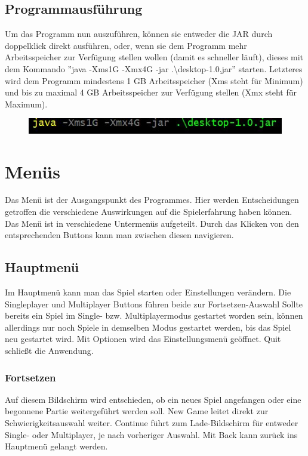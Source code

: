 \documentclass[fontsize=12pt,paper=a4,twoside]{scrartcl}
\begin{document}

\subsection{Programmausführung}

Um das Programm nun auszuführen, können sie entweder die JAR durch doppelklick direkt ausführen, oder, wenn sie dem Programm mehr Arbeitsspeicher zur Verfügung stellen wollen (damit es schneller läuft), dieses mit dem Kommando ''java -Xms1G -Xmx4G -jar .\textbackslash desktop-1.0,jar'' starten. Letzteres wird dem Programm mindestens 1 GB Arbeitsspeicher  (Xms steht für Minimum) und bis zu maximal 4 GB Arbeitsspeicher zur Verfügung stellen (Xmx steht für Maximum).

\begin{figure}[h!]
\centering
\includegraphics[width=0.8\linewidth]{run_application.JPG}
\end{figure} 


\section{Menüs}
Das Menü ist der Ausgangspunkt des Programmes. Hier werden Entscheidungen getroffen die verschiedene Auswirkungen auf die Spielerfahrung haben können.
Das Menü ist in verschiedene Untermenüs aufgeteilt. Durch das Klicken von den entsprechenden Buttons kann man zwischen diesen navigieren.

\subsection{Hauptmenü}
Im Hauptmenü kann man das Spiel starten oder Einstellungen verändern. Die Singleplayer und Multiplayer Buttons führen beide zur Fortsetzen-Auswahl
Sollte bereits ein Spiel im Single- bzw. Multiplayermodus gestartet worden sein, können allerdings nur noch Spiele in demselben Modus gestartet werden, bis das Spiel neu gestartet wird.
Mit Optionen wird das Einstellungsmenü geöffnet.
Quit schließt die Anwendung.

\subsubsection{Fortsetzen}
Auf diesem Bildschirm wird entschieden, ob ein neues Spiel angefangen oder eine begonnene Partie weitergeführt werden soll. New Game leitet direkt zur Schwierigkeitsauswahl weiter. Continue führt zum Lade-Bildschirm für entweder Single- oder Multiplayer, je nach vorheriger Auswahl.
Mit Back kann zurück ins Hauptmenü gelangt werden.
\end{document}
